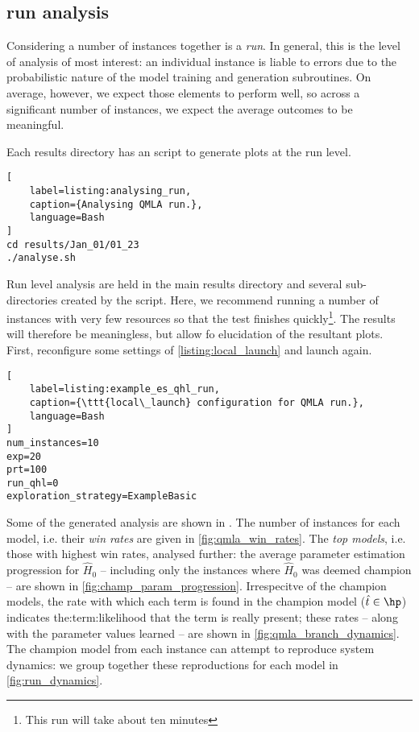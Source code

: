 \subsection{run analysis}
Considering a number of instances together is a \emph{run}. 
In general, this is the level of analysis of most interest: 
    an individual instance is liable to errors due to the probabilistic nature of 
    the model training and generation subroutines. 
On average, however, we expect those elements to perform well, 
    so across a significant number of instances, we expect the average outcomes to be meaningful. 
\par 

Each results directory has an  script to generate plots at the run level. 
\begin{lstlisting}[
    label=listing:analysing_run,
    caption={Analysing QMLA run.},
    language=Bash
]
cd results/Jan_01/01_23
./analyse.sh
\end{lstlisting}

Run level analysis are held in the main results directory and several sub-directories created by the  script. 
Here, we recommend running a number of instances with very few resources so that the test finishes quickly\footnote{This run will take about ten minutes}. 
The results will therefore be meaningless, but allow fo elucidation of the resultant plots. 
First, reconfigure some settings of \cref{listing:local_launch} and launch again.
\begin{lstlisting}[
    label=listing:example_es_qhl_run,
    caption={\ttt{local\_launch} configuration for QMLA run.},
    language=Bash
]
num_instances=10
exp=20
prt=100
run_qhl=0
exploration_strategy=ExampleBasic
\end{lstlisting}
\par 

Some of the generated analysis are shown in . 
The number of instances for each model, i.e. their \emph{win rates} are given in \cref{fig:qmla_win_rates}.
The \emph{top models}, i.e. those with highest win rates, analysed further: 
    the average parameter estimation progression for $\hat{H}_{0}$ -- including only the instances where $\hat{H}_{0}$ was deemed champion --
    are shown in \cref{fig:champ_param_progression}.
Irrespecitve of the champion models, the rate with which each term is found in the champion model ($\hat{t} \in \hp$)
    indicates the:term:likelihood that the term is really present;
    these rates -- along with the parameter values learned -- are shown in \cref{fig:qmla_branch_dynamics}.
The champion model from each instance can attempt to reproduce system dynamics: 
    we group together these reproductions for each model in \cref{fig:run_dynamics}. 

